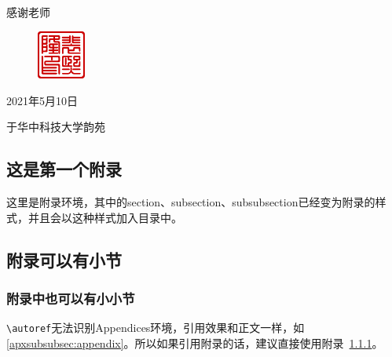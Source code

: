 \documentclass[supercite]{HustGraduPaper}
\begin{document}
\begin{thankpage}
	感谢老师
	\begin{figure}[htb]
		\flushright
		\includegraphics[width=16mm]{Figures/Seal-pxl.pdf}
	\end{figure}

	\begin{flushright}
		2021年5月10日

		于华中科技大学韵苑
	\end{flushright}
	
\end{thankpage}



\begin{appendices}
	\section{这是第一个附录}
	这里是附录环境，其中的section、subsection、subsubsection已经变为附录的样式，并且会以这种样式加入目录中。
	\subsection{附录可以有小节}
	\subsubsection{附录中也可以有小小节}\label{apxsubsubsec:appendix}
	\verb|\autoref|无法识别Appendices环境，引用效果和正文一样，如\autoref{apxsubsubsec:appendix}。所以如果引用附录的话，建议直接使用附录~\ref{apxsubsubsec:appendix}。
\end{appendices}
\end{document}
